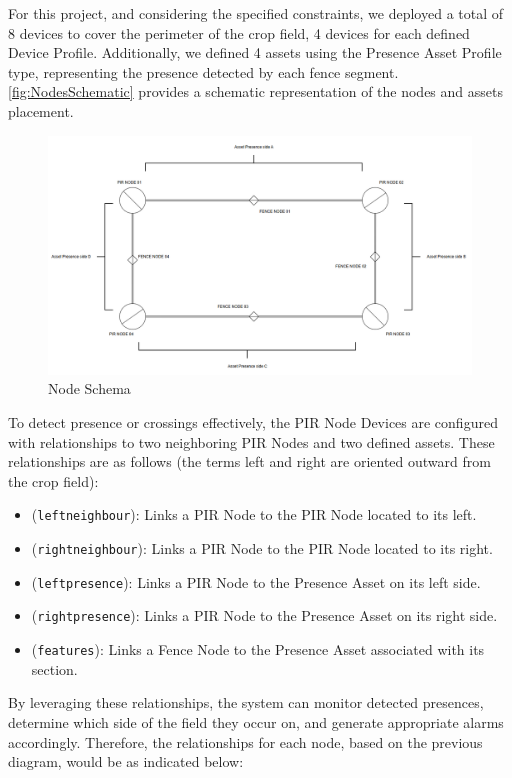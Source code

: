 For this project, and considering the specified constraints, we deployed a total of 8 devices to cover the perimeter of the crop field, 4 devices for each defined Device 
Profile. Additionally, we defined 4 assets using the Presence Asset Profile type, representing the presence detected by each fence segment. \autoref{fig:NodesSchematic} provides a schematic 
representation of the nodes and assets placement.
\begin{figure}[H]
    \centering
    \includegraphics[width=1\textwidth]{./images/8/NodesSchematic.PNG}
    \caption{Node Schema}
    \label{fig:NodesSchematic}
\end{figure}

To detect presence or crossings effectively, the PIR Node Devices are configured with relationships to two neighboring PIR Nodes and two defined assets. These relationships 
are as follows (the terms left and right are oriented outward from the crop field):
\begin{itemize}
    \item (\texttt{leftneighbour}): Links a PIR Node to the PIR Node located to its left.
    \item (\texttt{rightneighbour}): Links a PIR Node to the PIR Node located to its right.
    \item (\texttt{leftpresence}): Links a PIR Node to the Presence Asset on its left side.
    \item (\texttt{rightpresence}): Links a PIR Node to the Presence Asset on its right side.
    \item (\texttt{features}): Links a Fence Node to the Presence Asset associated with its section.
\end{itemize}
By leveraging these relationships, the system can monitor detected presences, determine which side of the field they occur on, and generate appropriate alarms accordingly. 
Therefore, the relationships for each node, based on the previous diagram, would be as indicated below:



